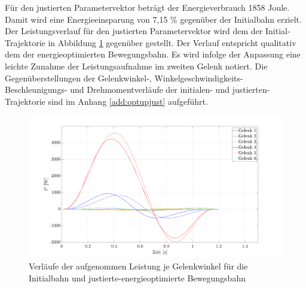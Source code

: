 %
%
Für den justierten Parametervektor beträgt der Energieverbrauch 1858 Joule. Damit wird eine Energieeinsparung von 7,15 \% gegenüber der Initialbahn erzielt. Der Leistungsverlauf für den justierten Parametervektor wird dem der Initial-Trajektorie in Abbildung \ref{fig:poptfinal} gegenüber gestellt. Der Verlauf entspricht qualitativ dem der  energieoptimierten Bewegungsbahn. Es wird infolge der Anpassung eine leichte Zunahme der Leistungsaufnahme im zweiten Gelenk notiert. Die Gegenüberstellungen der Gelenkwinkel-, Winkelgeschwindigkeits- Beschleunigungs- und Drehmomentverläufe der  initialen- und justierten-Trajektorie sind im Anhang \ref{add:optupjust} aufgeführt.
%
\begin{figure}[tbph]
	\centering
	\includegraphics[width=1\linewidth]{images/Optimierungsergebnisse_up/poptfinal}
	\caption{Verläufe der aufgenommen Leistung je Gelenkwinkel für die Initialbahn und justierte-energieoptimierte Bewegungsbahn}
	\label{fig:poptfinal}
\end{figure}
